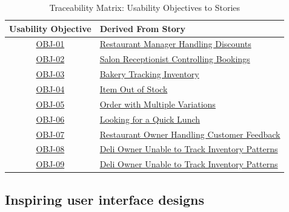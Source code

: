 \documentclass[]{VUMIFTemplateClass}
\begin{document}
\begin{table}[H]
\centering
\caption{Traceability Matrix: Usability Objectives to Stories}
\begin{tabular}{|c|l|}
\hline
\textbf{Usability Objective}  & \textbf{Derived From Story} \\
\hline
\hyperref[OBJ-01]{OBJ-01} & \hyperref[subsubsubsec:restaurant-discounts]{Restaurant Manager Handling Discounts} \\
\hline
\hyperref[OBJ-02]{OBJ-02} & \hyperref[subsubsubsec:salon-receptionist]{Salon Receptionist Controlling Bookings} \\
\hline
\hyperref[OBJ-03]{OBJ-03} & \hyperref[subsubsubsec:bakery-inventory]{Bakery Tracking Inventory} \\
\hline
\hyperref[OBJ-04]{OBJ-04} & \hyperref[subsubsubsec:item-out-of-stock]{Item Out of Stock} \\
\hline
\hyperref[OBJ-05]{OBJ-05} & \hyperref[subsubsubsec:multiple-variations]{Order with Multiple Variations} \\
\hline
\hyperref[OBJ-06]{OBJ-06} & \hyperref[subsubsubsec:quick-lunch]{Looking for a Quick Lunch} \\
\hline
\hyperref[OBJ-07]{OBJ-07} & \hyperref[subsubsubsec:owner-feedback]{Restaurant Owner Handling Customer Feedback} \\
\hline
\hyperref[OBJ-08]{OBJ-08} & \hyperref[subsubsubsec:deli-inventory]{Deli Owner Unable to Track Inventory Patterns} \\
\hline
\hyperref[OBJ-09]{OBJ-09} & \hyperref[subsubsubsec:deli-inventory]{Deli Owner Unable to Track Inventory Patterns} \\
\hline
\end{tabular}
\end{table}


\subsection{Inspiring user interface designs}
\end{document}
